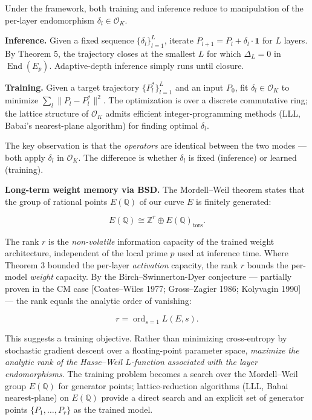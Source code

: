 \documentclass[
  11pt,
]{article}
\begin{document}
Under the framework, both training and inference reduce to manipulation
of the per-layer endomorphism \(\delta_l \in \mathcal{O}_K\).

\textbf{Inference.} Given a fixed sequence \(\{\delta_l\}_{l=1}^L\),
iterate \(P_{l+1} = P_l + \delta_l \cdot \mathbf{1}\) for \(L\) layers.
By Theorem 5, the trajectory closes at the smallest \(L\) for which
\(\Delta_L = 0\) in \(\operatorname{End}(E_p)\). Adaptive-depth
inference simply runs until closure.

\textbf{Training.} Given a target trajectory \(\{P_l^*\}_{l=1}^L\) and
an input \(P_0\), fit \(\delta_l \in \mathcal{O}_K\) to minimize
\(\sum_l \|P_l - P_l^*\|^2\). The optimization is over a discrete
commutative ring; the lattice structure of \(\mathcal{O}_K\) admits
efficient integer-programming methods (LLL, Babai's nearest-plane
algorithm) for finding optimal \(\delta_l\).

The key observation is that the \emph{operators} are identical between
the two modes --- both apply \(\delta_l\) in \(\mathcal{O}_K\). The
difference is whether \(\delta_l\) is fixed (inference) or learned
(training).

\textbf{Long-term weight memory via BSD.} The Mordell--Weil theorem
states that the group of rational points \(E(\mathbb{Q})\) of our curve
\(E\) is finitely generated:

\[E(\mathbb{Q}) \cong \mathbb{Z}^r \oplus E(\mathbb{Q})_{\mathrm{tors}}.\]

The rank \(r\) is the \emph{non-volatile} information capacity of the
trained weight architecture, independent of the local prime \(p\) used
at inference time. Where Theorem 3 bounded the per-layer
\emph{activation} capacity, the rank \(r\) bounds the per-model
\emph{weight} capacity. By the Birch--Swinnerton-Dyer conjecture ---
partially proven in the CM case {[}Coates--Wiles 1977; Gross--Zagier
1986; Kolyvagin 1990{]} --- the rank equals the analytic order of
vanishing:

\[r = \operatorname{ord}_{s=1} L(E, s).\]

This suggests a training objective. Rather than minimizing cross-entropy
by stochastic gradient descent over a floating-point parameter space,
\emph{maximize the analytic rank of the Hasse--Weil \(L\)-function
associated with the layer endomorphisms}. The training problem becomes a
search over the Mordell--Weil group \(E(\mathbb{Q})\) for generator
points; lattice-reduction algorithms (LLL, Babai nearest-plane) on
\(E(\mathbb{Q})\) provide a direct search and an explicit set of
generator points \(\{P_1, \dots, P_r\}\) as the trained model.
\end{document}
